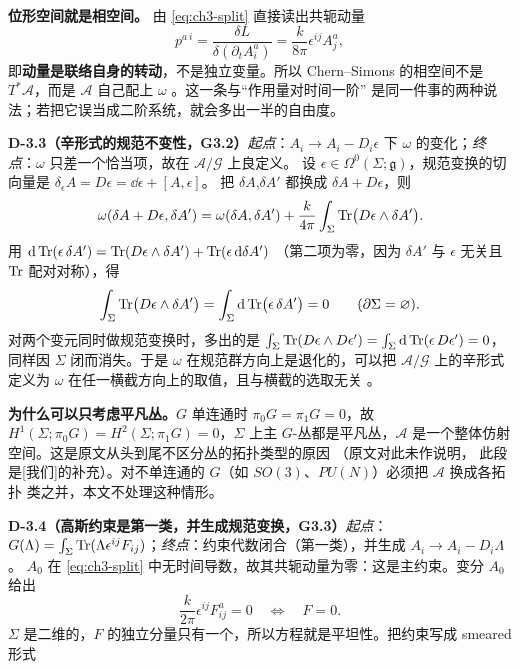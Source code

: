 \begin{keypoint}
\textbf{位形空间就是相空间。} 由 \eqref{eq:ch3-split} 直接读出共轭动量
\begin{equation}
p^{a\,i}=\frac{\delta L}{\delta(\partial_tA_i^a)}=\frac{k}{8\pi}\epsilon^{ij}A_j^a ,
\end{equation}
即\textbf{动量是联络自身的转动}，不是独立变量。所以 Chern--Simons 的相空间不是
$T^*\mathcal A$，而是 $\mathcal A$ 自己配上 $\omega$ 。这一条与“作用量对时间一阶”
是同一件事的两种说法；若把它误当成二阶系统，就会多出一半的自由度。
\end{keypoint}

\noindent\textbf{D-3.3（辛形式的规范不变性，G3.2）}\quad\emph{起点}：$A_i\to A_i-D_i\epsilon$ 下 $\omega$ 的变化；\emph{终点}：$\omega$ 只差一个恰当项，故在 $\mathcal{A}/\mathcal{G}$ 上良定义。
设 $\epsilon\in\Omega^0(\Sigma;\mathfrak g)$，规范变换的切向量是 $\delta_\epsilon A=D\epsilon=\dd\epsilon+[A,\epsilon]$。
把 $\delta A$,$\delta A'$ 都换成 $\delta A+D\epsilon$，则
\begin{equation}
\omega(\delta A+D\epsilon,\delta A')
=\omega(\delta A,\delta A')+\frac{k}{4\pi}\int_\Sigma\operatorname{Tr}\bigl(D\epsilon\wedge\delta A'\bigr).
\end{equation}
用 $\mathrm{d}\operatorname{Tr}(\epsilon\,\delta A')=\operatorname{Tr}(D\epsilon\wedge\delta A')+\operatorname{Tr}(\epsilon\,\mathrm{d}\delta A')$
（第二项为零，因为 $\delta A'$ 与 $\epsilon$ 无关且 $\operatorname{Tr}$ 配对对称），得
\begin{equation}
\int_\Sigma\operatorname{Tr}\bigl(D\epsilon\wedge\delta A'\bigr)=\int_\Sigma\mathrm{d}\operatorname{Tr}\bigl(\epsilon\,\delta A'\bigr)=0
\qquad(\partial\Sigma=\varnothing).
\end{equation}
对两个变元同时做规范变换时，多出的是 $\int_\Sigma\operatorname{Tr}(D\epsilon\wedge D\epsilon')=\int_\Sigma\mathrm{d}\operatorname{Tr}(\epsilon\,D\epsilon')=0$，
同样因 $\Sigma$ 闭而消失。于是 $\omega$ 在规范群方向上是退化的，可以把 $\mathcal A/\mathcal G$
上的辛形式定义为 $\omega$ 在任一横截方向上的取值，且与横截的选取无关 \ours。

\begin{keypoint}
\textbf{为什么可以只考虑平凡丛。}$G$ 单连通时 $\pi_0G=\pi_1G=0$，故
$H^1(\Sigma;\pi_0G)=H^2(\Sigma;\pi_1G)=0$，$\Sigma$ 上主 $G$-丛都是平凡丛，$\mathcal A$
是一个整体仿射空间。这是原文从头到尾不区分丛的拓扑类型的原因 （原文对此未作说明，
此段是[我们]的补充）。对不单连通的 $G$（如 $SO(3)$、$PU(N)$）必须把 $\mathcal A$ 换成各拓扑
类之并，本文不处理这种情形。
\end{keypoint}

\noindent\textbf{D-3.4（高斯约束是第一类，并生成规范变换，G3.3）}\quad\emph{起点}：$G(\Lambda)=\int_\Sigma\operatorname{Tr}(\Lambda\epsilon^{ij}F_{ij})$；\emph{终点}：约束代数闭合（第一类），并生成 $A_i\to A_i-D_i\Lambda$。
$A_0$ 在 \eqref{eq:ch3-split} 中无时间导数，故其共轭动量为零：这是主约束。变分 $A_0$ 给出
\begin{equation}
\frac{k}{2\pi}\epsilon^{ij}F^a_{ij}=0\quad\Longleftrightarrow\quad F=0 .
\label{eq:ch3-gauss}
\end{equation}
$\Sigma$ 是二维的，$F$ 的独立分量只有一个，所以方程就是平坦性。把约束写成 smeared 形式

